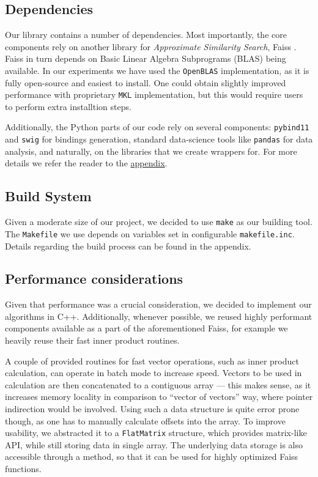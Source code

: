 
\subsection{Dependencies}

Our library contains a number of dependencies. Most importantly, the core components rely on 
another library for \textit{Approximate Similarity Search}, Faiss \cite{faiss}.
Faiss in turn depends on Basic Linear Algebra Subprograms (BLAS) being available. In our experiments we have used
the \texttt{OpenBLAS} \cite{openblas} implementation, as it is fully open-source and easiest to install. One
could obtain slightly improved performance with proprietary \texttt{MKL} \cite{mkl} implementation, but this would require
users to perform extra installtion steps.

Additionally, the Python parts of our code rely on several components: \texttt{pybind11} and \texttt{swig}
for bindings generation, standard data-science tools like \texttt{pandas} for data analysis, and naturally, on the
libraries that we create wrappers for. For more details we refer the reader to the \hyperref[sec:appendices]{appendix}.

\subsection{Build System}

Given a moderate size of our project, we decided to use \texttt{make} as our building tool. The \texttt{Makefile} we use
depends on variables set in configurable \texttt{makefile.inc}. Details regarding the build process can be found in the appendix.

\subsection{Performance considerations}

Given that performance was a crucial consideration, we decided to implement our algorithms in C++.
Additionally, whenever possible, we reused highly performant components available as a part of the aforementioned Faiss,
for example we heavily reuse their fast inner product routines. 

A couple of provided routines for fast vector operations, such as inner product calculation, can
operate in batch mode to increase speed. Vectors to be used in calculation are then concatenated
to a contiguous array --- this makes sense, as it increases memory locality in comparison
to ``vector of vectors'' way, where pointer indirection would be involved. Using such a data structure
is quite error prone though, as one has to manually calculate offsets into the array. To improve
usability, we abstracted it to a \texttt{FlatMatrix} structure, which provides matrix-like API, while
still storing data in single array. The underlying data storage is also accessible through a method,
so that it can be used for highly optimized Faiss functions.

